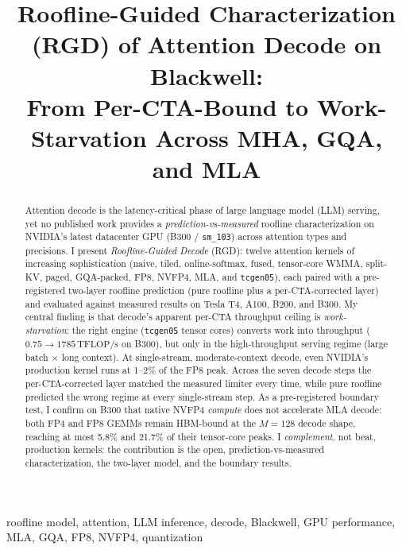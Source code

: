 \documentclass[conference]{IEEEtran}
\newcommand{\tflops}{\,\text{TFLOP/s}}
\begin{document}
\title{Roofline-Guided Characterization (RGD) of Attention Decode on Blackwell:\\
From Per-CTA-Bound to Work-Starvation Across MHA, GQA, and MLA}

\author{
}

\maketitle

\begin{abstract}
Attention decode is the latency-critical phase of large language model (LLM)
serving, yet no published work provides a \emph{prediction-vs-measured} roofline
characterization on NVIDIA's latest datacenter GPU (B300 / \texttt{sm\_103})
across attention types and precisions. I present \emph{Roofline-Guided Decode}
(RGD): twelve attention kernels of increasing sophistication (naive, tiled,
online-softmax, fused, tensor-core WMMA, split-KV, paged, GQA-packed, FP8,
NVFP4, MLA, and \texttt{tcgen05}), each paired with a pre-registered two-layer roofline
prediction (pure roofline plus a per-CTA-corrected layer) and evaluated against
measured results on Tesla T4, A100, B200, and B300. My central finding is that decode's apparent per-CTA
throughput ceiling is \emph{work-starvation}: the right engine
(\texttt{tcgen05} tensor cores) converts work into throughput
($0.75 \to 1785\tflops$ on B300), but only in the high-throughput serving regime
(large batch $\times$ long context). At single-stream, moderate-context decode,
even NVIDIA's production kernel runs at 1--2\% of the FP8 peak. Across the seven
decode steps the per-CTA-corrected layer matched the measured limiter every time,
while pure roofline predicted the wrong regime at every single-stream step. As a
pre-registered boundary test, I confirm on B300 that native NVFP4 \emph{compute}
does not accelerate MLA decode: both FP4 and FP8 GEMMs remain HBM-bound at the
$M{=}128$ decode shape, reaching at most 5.8\% and 21.7\% of their tensor-core
peaks. I
\emph{complement}, not beat, production kernels: the contribution is the open,
prediction-vs-measured characterization, the two-layer model, and the boundary
results.
\end{abstract}

\begin{IEEEkeywords}
roofline model, attention, LLM inference, decode, Blackwell, GPU performance,
MLA, GQA, FP8, NVFP4, quantization
\end{IEEEkeywords}
\end{document}
